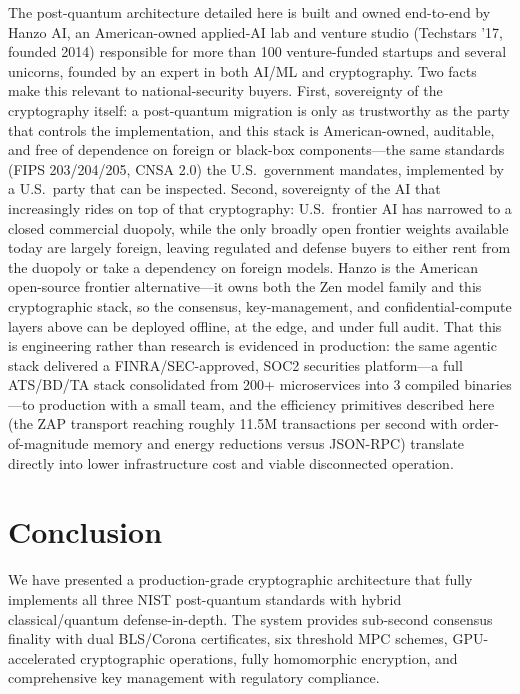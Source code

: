 \documentclass[11pt,letterpaper]{article}
\begin{document}
The post-quantum architecture detailed here is built and owned end-to-end by Hanzo AI, an American-owned applied-AI lab and venture studio (Techstars '17, founded 2014) responsible for more than 100 venture-funded startups and several unicorns, founded by an expert in both AI/ML and cryptography. Two facts make this relevant to national-security buyers. First, sovereignty of the cryptography itself: a post-quantum migration is only as trustworthy as the party that controls the implementation, and this stack is American-owned, auditable, and free of dependence on foreign or black-box components---the same standards (FIPS 203/204/205, CNSA 2.0) the U.S.\ government mandates, implemented by a U.S.\ party that can be inspected. Second, sovereignty of the AI that increasingly rides on top of that cryptography: U.S.\ frontier AI has narrowed to a closed commercial duopoly, while the only broadly open frontier weights available today are largely foreign, leaving regulated and defense buyers to either rent from the duopoly or take a dependency on foreign models. Hanzo is the American open-source frontier alternative---it owns both the Zen model family and this cryptographic stack, so the consensus, key-management, and confidential-compute layers above can be deployed offline, at the edge, and under full audit. That this is engineering rather than research is evidenced in production: the same agentic stack delivered a FINRA/SEC-approved, SOC2 securities platform---a full ATS/BD/TA stack consolidated from 200+ microservices into 3 compiled binaries---to production with a small team, and the efficiency primitives described here (the ZAP transport reaching roughly 11.5M transactions per second with order-of-magnitude memory and energy reductions versus JSON-RPC) translate directly into lower infrastructure cost and viable disconnected operation.

\section{Conclusion}

We have presented a production-grade cryptographic architecture that fully implements all three NIST post-quantum standards with hybrid classical/quantum defense-in-depth. The system provides sub-second consensus finality with dual BLS/Corona certificates, six threshold MPC schemes, GPU-accelerated cryptographic operations, fully homomorphic encryption, and comprehensive key management with regulatory compliance.
\end{document}
